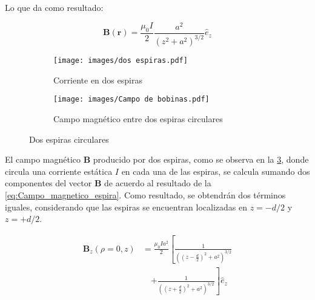 Lo que da como resultado:

\begin{equation} 
    \mathbf{B}(\mathbf{r}) = \frac{\mu_{0}I}{2} \frac{a^{2}}{(z^{2}+a^{2})^{3/2}} \hat{e}_{z}
    \label{eq:Campo_magnetico_espira}
\end{equation} 

\begin{figure}[H]
    \centering
    \begin{subfigure}[a]{0.45\textwidth}
        \centering
        \texttt{[image: images/dos espiras.pdf]}
        \caption{Corriente en dos espiras}
        \label{fig:I_en_dos_espiras}
    \end{subfigure}
    \hfill
    \begin{subfigure}[b]{0.45\textwidth}
        \centering
        \texttt{[image: images/Campo de bobinas.pdf]}
        \caption{Campo magnético entre dos espiras circulares}
        \label{fig:CM_dos_espiras}
    \end{subfigure}
    \caption{Dos espiras circulares}
    \label{fig:dos_espiras}
\end{figure}

El campo magnético $\mathbf{B}$ producido por dos espiras, como se observa en la \cref{fig:dos_espiras}, donde circula una corriente estática $I$ en cada una de las espiras, se calcula sumando dos componentes del vector $\mathbf{B}$ de acuerdo al resultado de la \cref{eq:Campo_magnetico_espira}. Como resultado, se obtendrán dos términos iguales, considerando que las espiras se encuentran localizadas en $z = -d/2$ y $z = +d/2$.

\begin{equation}
\begin{aligned}
    \mathbf{B}_{z}(\rho=0,z) &= \frac{\mu_{0} I a^{2}}{2} \left[ \frac{1}{\left((z-\frac{d}{2})^{2} + a^{2}\right)^{3/2}} \right.\\
    &\quad \left.+ \frac{1}{\left((z+\frac{d}{2})^{2} + a^{2}\right)^{3/2}} \right] \hat{e}_{z}
    \label{Campo_magnetico_2espiras}
\end{aligned}
\end{equation}

